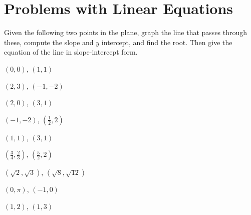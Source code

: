 \documentclass[crop=false,class=book,oneside]{standalone}                      %
\begin{document}
    \section{Problems with Linear Equations}
        \begin{problem}
            Given the following two points in the plane,
            graph the line that passes through these, compute
            the slope and $y$ intercept, and find the root.
            Then give the equation of the line in slope-intercept
            form.
            \begin{enumerate}
                \begin{multicols}{3}
                    \item $(0,0)$, $(1,1)$
                    \item $(2,3)$, $(\minus{1},\minus{2})$
                    \item $(2,0)$, $(3,1)$
                    \item $(\minus{1},\minus{2})$, $(\frac{1}{2},2)$
                    \item $(1,1)$, $(3,1)$
                    \item $(\frac{3}{4},\frac{2}{3})$, $(\frac{5}{2},2)$
                    \item $(\sqrt{2},\sqrt{3})$, $(\sqrt{8},\sqrt{12})$
                    \item $(0,\pi)$, $(\minus{1},0)$
                    \item $(1,2)$, $(1,3)$
                \end{multicols}
            \end{enumerate}
        \end{problem}
\end{document}
